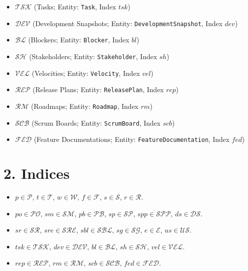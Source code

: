 \documentclass[11pt,a4paper]{article}
\begin{document}
\begin{itemize}[leftmargin=2em]
  \item $\mathcal{TSK}$ (Tasks; Entity: \texttt{Task}, Index $tsk$)
  \item $\mathcal{DEV}$ (Development Snapshots; Entity: \texttt{DevelopmentSnapshot}, Index $dev$)
  \item $\mathcal{BL}$ (Blockers; Entity: \texttt{Blocker}, Index $bl$)
  \item $\mathcal{SH}$ (Stakeholders; Entity: \texttt{Stakeholder}, Index $sh$)
  \item $\mathcal{VEL}$ (Velocities; Entity: \texttt{Velocity}, Index $vel$)
  \item $\mathcal{REP}$ (Release Plans; Entity: \texttt{ReleasePlan}, Index $rep$)
  \item $\mathcal{RM}$ (Roadmaps; Entity: \texttt{Roadmap}, Index $rm$)
  \item $\mathcal{SCB}$ (Scrum Boards; Entity: \texttt{ScrumBoard}, Index $scb$)
  \item $\mathcal{FED}$ (Feature Documentations; Entity: \texttt{FeatureDocumentation}, Index $fed$)
\end{itemize}

\section{2. Indices}
\begin{itemize}[leftmargin=2em]
  \item $p \in \mathcal{P}$,\; $t \in \mathcal{T}$,\; $w \in \mathcal{W}$,\; $f \in \mathcal{F}$,\; $s \in \mathcal{S}$,\; $r \in \mathcal{R}$.
  \item $po \in \mathcal{PO}$,\; $sm \in \mathcal{SM}$,\; $pb \in \mathcal{PB}$,\; $sp \in \mathcal{SP}$,\; $spp \in \mathcal{SPP}$,\; $ds \in \mathcal{DS}$.
  \item $sr \in \mathcal{SR}$,\; $sre \in \mathcal{SRE}$,\; $sbl \in \mathcal{SBL}$,\; $sg \in \mathcal{SG}$,\; $e \in \mathcal{E}$,\; $us \in \mathcal{US}$.
  \item $tsk \in \mathcal{TSK}$,\; $dev \in \mathcal{DEV}$,\; $bl \in \mathcal{BL}$,\; $sh \in \mathcal{SH}$,\; $vel \in \mathcal{VEL}$.
  \item $rep \in \mathcal{REP}$,\; $rm \in \mathcal{RM}$,\; $scb \in \mathcal{SCB}$,\; $fed \in \mathcal{FED}$.
\end{itemize}
\end{document}
